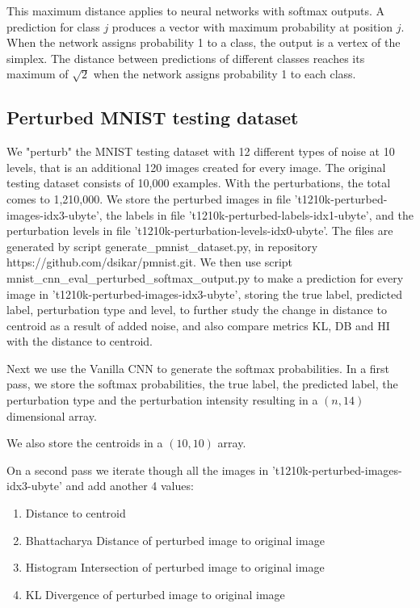 This maximum distance applies to neural networks with softmax outputs. A prediction for class $j$ produces a vector with maximum probability at position $j$. When the network assigns probability 1 to a class, the output is a vertex of the simplex. The distance between predictions of different classes reaches its maximum of $\sqrt{2}$ when the network assigns probability 1 to each class.


\subsection{Perturbed MNIST testing dataset}

We "perturb" the MNIST testing dataset with 12 different types of noise at 10 levels, that is an additional 120 images created for every image. The original testing dataset consists of 10,000 examples. With the perturbations, the total comes to 1,210,000. We store the perturbed images in file 't1210k-perturbed-images-idx3-ubyte', the labels in file 't1210k-perturbed-labels-idx1-ubyte', and the perturbation levels in file 't1210k-perturbation-levels-idx0-ubyte'. The files are generated by script generate\_pmnist\_dataset.py, in repository https://github.com/dsikar/pmnist.git. 
We then use script mnist\_cnn\_eval\_perturbed\_softmax\_output.py to make a prediction for every image in 't1210k-perturbed-images-idx3-ubyte', storing the true label, predicted label, perturbation type and level, to further study the change in distance to centroid as a result of added noise, and also compare metrics KL, DB and HI with the distance to centroid.

Next we use the Vanilla CNN to generate the softmax probabilities. In a first pass, we store the softmax probabilities, the true label, the predicted label, the perturbation type and the perturbation intensity resulting in a $(n,14)$ dimensional array.

We also store the centroids in a $(10,10)$ array.

On a second pass we iterate though all the images in 't1210k-perturbed-images-idx3-ubyte' and add another 4 values:

\begin{enumerate}
    \item Distance to centroid
    \item Bhattacharya Distance of perturbed image to original image
    \item Histogram Intersection of perturbed image to original image
    \item KL Divergence of perturbed image to original image
\end{enumerate}

